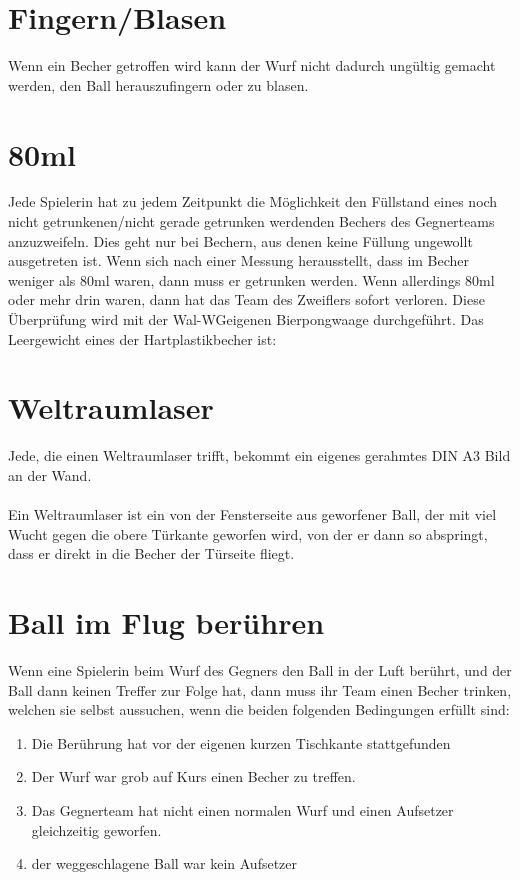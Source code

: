 \documentclass[a5paper, 12pt]{book}
\begin{document}
\section{Fingern/Blasen}\label{sec:fingern/blasen}
Wenn ein Becher getroffen wird kann der Wurf nicht dadurch ungültig gemacht werden, den Ball herauszufingern oder zu blasen.
\section{80ml}\label{sec:80ml}
Jede Spielerin hat zu jedem Zeitpunkt die Möglichkeit den Füllstand eines noch nicht getrunkenen/nicht gerade getrunken werdenden Bechers des Gegnerteams anzuzweifeln. Dies geht nur bei Bechern, aus denen keine Füllung ungewollt ausgetreten ist. Wenn sich nach einer Messung herausstellt, dass im Becher weniger als 80ml waren, dann muss er getrunken werden. Wenn allerdings 80ml oder mehr drin waren, dann hat das Team des Zweiflers sofort verloren. Diese Überprüfung wird mit der Wal-WG\texttrademark eigenen Bierpongwaage durchgeführt. Das Leergewicht eines der Hartplastikbecher ist:
\section{Weltraumlaser}\label{sec:weltraumlaser}
Jede, die einen Weltraumlaser trifft, bekommt ein eigenes gerahmtes DIN A3 Bild an der Wand. \\\\ Ein Weltraumlaser ist ein von der Fensterseite aus geworfener Ball, der mit viel Wucht gegen die obere Türkante geworfen wird, von der er dann so abspringt, dass er direkt in die Becher der Türseite fliegt. 
\section{Ball im Flug berühren}\label{sec:ballimflugberühren}
Wenn eine Spielerin beim Wurf des Gegners den Ball in der Luft berührt, und der Ball dann keinen Treffer zur Folge hat, dann muss ihr Team einen Becher trinken, welchen sie selbst aussuchen, wenn die beiden folgenden Bedingungen erfüllt sind:
\begin{enumerate}[(1)]
    \item Die Berührung hat vor der eigenen kurzen Tischkante stattgefunden
    \item Der Wurf war grob auf Kurs einen Becher zu treffen.
    \item Das Gegnerteam hat nicht einen normalen Wurf und einen Aufsetzer gleichzeitig geworfen.
    \item der weggeschlagene Ball war kein Aufsetzer
\end{enumerate}
\end{document}
